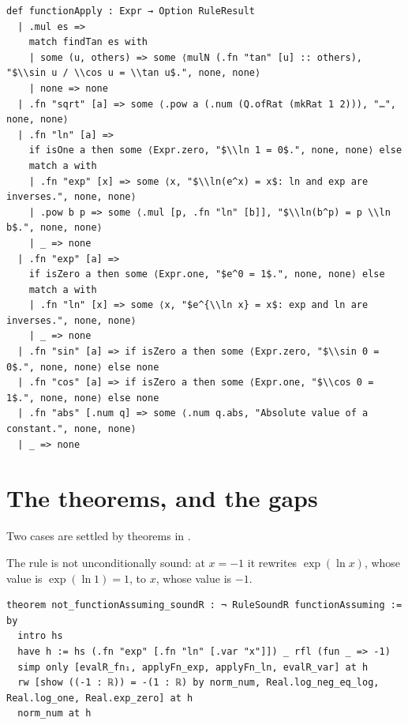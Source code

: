 \begin{verbatim}
def functionApply : Expr → Option RuleResult
  | .mul es =>
    match findTan es with
    | some (u, others) => some ⟨mulN (.fn "tan" [u] :: others), "$\\sin u / \\cos u = \\tan u$.", none, none⟩
    | none => none
  | .fn "sqrt" [a] => some ⟨.pow a (.num (Q.ofRat (mkRat 1 2))), "…", none, none⟩
  | .fn "ln" [a] =>
    if isOne a then some ⟨Expr.zero, "$\\ln 1 = 0$.", none, none⟩ else
    match a with
    | .fn "exp" [x] => some ⟨x, "$\\ln(e^x) = x$: ln and exp are inverses.", none, none⟩
    | .pow b p => some ⟨.mul [p, .fn "ln" [b]], "$\\ln(b^p) = p \\ln b$.", none, none⟩
    | _ => none
  | .fn "exp" [a] =>
    if isZero a then some ⟨Expr.one, "$e^0 = 1$.", none, none⟩ else
    match a with
    | .fn "ln" [x] => some ⟨x, "$e^{\\ln x} = x$: exp and ln are inverses.", none, none⟩
    | _ => none
  | .fn "sin" [a] => if isZero a then some ⟨Expr.zero, "$\\sin 0 = 0$.", none, none⟩ else none
  | .fn "cos" [a] => if isZero a then some ⟨Expr.one, "$\\cos 0 = 1$.", none, none⟩ else none
  | .fn "abs" [.num q] => some ⟨.num q.abs, "Absolute value of a constant.", none, none⟩
  | _ => none
\end{verbatim}

\section{The theorems, and the gaps}

Two cases are settled by theorems in .

\begin{thmbox}
  The rule is not unconditionally sound: at $x = -1$ it rewrites $\exp(\ln x)$, whose value is
  $\exp(\ln 1) = 1$, to $x$, whose value is $-1$.
\end{thmbox}

\begin{verbatim}
theorem not_functionAssuming_soundR : ¬ RuleSoundR functionAssuming := by
  intro hs
  have h := hs (.fn "exp" [.fn "ln" [.var "x"]]) _ rfl (fun _ => -1)
  simp only [evalR_fn₁, applyFn_exp, applyFn_ln, evalR_var] at h
  rw [show ((-1 : ℝ)) = -(1 : ℝ) by norm_num, Real.log_neg_eq_log, Real.log_one, Real.exp_zero] at h
  norm_num at h
\end{verbatim}

